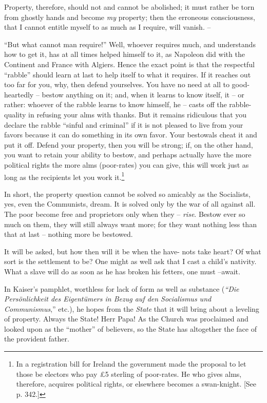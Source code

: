 Property, therefore, should not and cannot be abolished; it must rather be 
torn from ghostly hands and become \textit{my} property; then the erroneous 
consciousness, that I cannot entitle myself to as much as I require, will 
vanish. --

``But what cannot man require!'' Well, whoever requires much, and 
understands how to get it, has at all times helped himself to it, as Napoleon 
did with the Continent and France with Algiers. Hence the exact point is that 
the respectful ``rabble'' should learn at last to help itself to what it 
requires. If it reaches out too far for you, why, then defend yourselves. You 
have no need at all to good-heartedly -- bestow anything on it; and, when it 
learns to know itself, it -- or rather: whoever of the rabble learns to know 
himself, he -- casts off the rabble-quality in refusing your alms with thanks. 
But it remains ridiculous that you declare the rabble ``sinful and 
criminal'' if it is not pleased to live from your favors because it can do 
something in its own favor. Your bestowals cheat it and put it off. Defend 
your property, then you will be strong; if, on the other hand, you want to 
retain your ability to bestow, and perhaps actually have the more political 
rights the more alms (poor-rates) you can give, this will work just as long as 
the recipients let you work it.\footnote{In a registration bill for Ireland 
the government made the proposal to let those be electors who pay \pounds{}5 
sterling of poor-rates. He who gives alms, therefore, acquires political 
rights, or elsewhere becomes a swan-knight. [See p. 342.]}

In short, the property question cannot be solved so amicably as the 
Socialists, yes, even the Communists, dream. It is solved only by the war of 
all against all. The poor become free and proprietors only when they -- 
\textit{rise}. Bestow ever so much on them, they will still always want more; 
for they want nothing less than that at last -- nothing more be bestowed.

It will be asked, but how then will it be when the have- nots take heart? Of 
what sort is the settlement to be? One might as well ask that I cast a child's 
nativity. What a slave will do as soon as he has broken his fetters, one must 
--await.

In Kaiser's pamphlet, worthless for lack of form as well as substance 
(\textit{``Die Pers\"onlichkeit des Eigent\"umers in Bezug auf den 
Socialismus und Communismus},'' etc.), he hopes from the \textit{State} that 
it will bring about a leveling of property. Always the State! Herr Papa! As 
the Church was proclaimed and looked upon as the ``mother'' of believers, so 
the State has altogether the face of the provident father.


